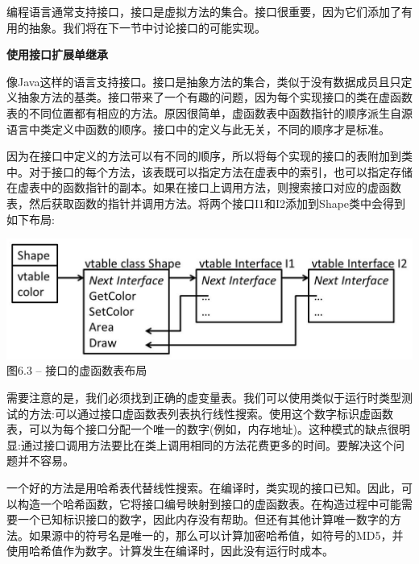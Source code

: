 编程语言通常支持接口，接口是虚拟方法的集合。接口很重要，因为它们添加了有用的抽象。我们将在下一节中讨论接口的可能实现。\par

\hspace*{\fill} \par %
\textbf{使用接口扩展单继承}

像Java这样的语言支持接口。接口是抽象方法的集合，类似于没有数据成员且只定义抽象方法的基类。接口带来了一个有趣的问题，因为每个实现接口的类在虚函数表的不同位置都有相应的方法。原因很简单，虚函数表中函数指针的顺序派生自源语言中类定义中函数的顺序。接口中的定义与此无关，不同的顺序才是标准。\par

因为在接口中定义的方法可以有不同的顺序，所以将每个实现的接口的表附加到类中。对于接口的每个方法，该表既可以指定方法在虚表中的索引，也可以指定存储在虚表中的函数指针的副本。如果在接口上调用方法，则搜索接口对应的虚函数表，然后获取函数的指针并调用方法。将两个接口I1和I2添加到Shape类中会得到如下布局:\par

\hspace*{\fill} \par %
\begin{center}
	\includegraphics{content/2/chapter6/images/3.jpg}\\
	图6.3 – 接口的虚函数表布局
\end{center}

需要注意的是，我们必须找到正确的虚变量表。我们可以使用类似于运行时类型测试的方法:可以通过接口虚函数表列表执行线性搜索。使用这个数字标识虚函数表，可以为每个接口分配一个唯一的数字(例如，内存地址)。这种模式的缺点很明显:通过接口调用方法要比在类上调用相同的方法花费更多的时间。要解决这个问题并不容易。\par

一个好的方法是用哈希表代替线性搜索。在编译时，类实现的接口已知。因此，可以构造一个哈希函数，它将接口编号映射到接口的虚函数表。在构造过程中可能需要一个已知标识接口的数字，因此内存没有帮助。但还有其他计算唯一数字的方法。如果源中的符号名是唯一的，那么可以计算加密哈希值，如符号的MD5，并使用哈希值作为数字。计算发生在编译时，因此没有运行时成本。\par

